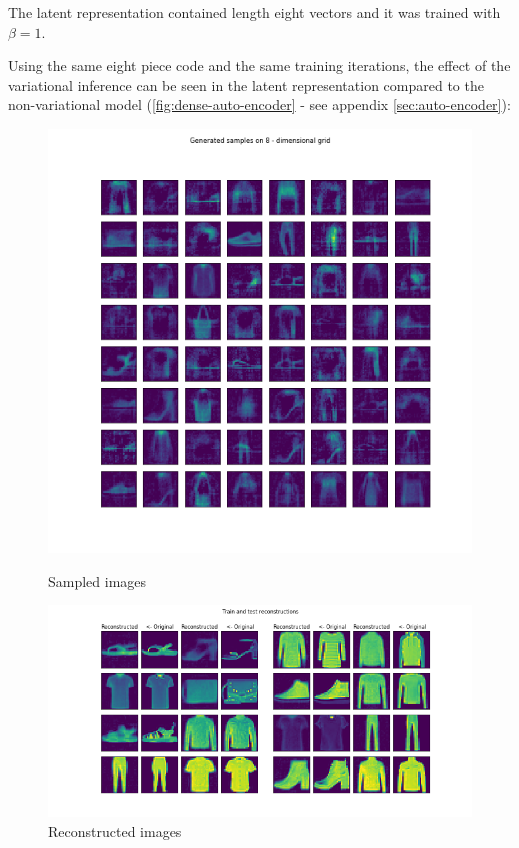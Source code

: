 \documentclass[12pt, english]{article}
\begin{document}
\vspace{4mm}

\par The latent representation contained length eight vectors and it was trained with $\beta = 1$.

\vspace{4mm}

\par Using the same eight piece code and the same training iterations, the effect of the variational inference can be seen in the latent representation compared to the non-variational model (\ref{fig:dense-auto-encoder} - see appendix \ref{sec:auto-encoder}):

\begin{figure}[ht] 
  \label{fig:auto_encoder_results} 
  \begin{minipage}{0.5\linewidth}
    \centering
    \includegraphics[width=.65\linewidth]{gen/generated_samples_fashion_mnist_auto_encoder.png} 
    \caption{Sampled images} 
  \end{minipage}%
  \begin{minipage}{0.5\linewidth}
    \centering
    \includegraphics[width=.95\linewidth]{reco/reconstrunction_samples_fashion_mnist_auto_encoder.png} 
    \caption{Reconstructed images} 
  \end{minipage} 
\end{figure}
\end{document}
